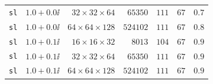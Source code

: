 \begin{tabular}{llrrrrr}
\texttt{sl} & $1.0+0.0\ii$ & $32\!\times\!32\!\times\!64$ & $65350$ & $111$ & $67$ & $0.7$ \\
\texttt{sl} & $1.0+0.0\ii$ & $64\!\times\!64\!\times\!128$ & $524102$ & $111$ & $67$ & $0.8$ \\
\texttt{sl} & $1.0+0.1\ii$ & $16\!\times\!16\!\times\!32$ & $8013$ & $104$ & $67$ & $0.9$ \\
\texttt{sl} & $1.0+0.1\ii$ & $32\!\times\!32\!\times\!64$ & $65350$ & $111$ & $67$ & $0.9$ \\
\texttt{sl} & $1.0+0.1\ii$ & $64\!\times\!64\!\times\!128$ & $524102$ & $111$ & $67$ & $0.9$ \\
\bottomrule
\end{tabular}
